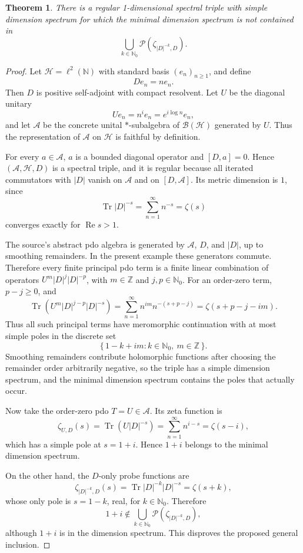 \documentclass[11pt]{article}
\newtheorem{theorem}{Theorem}
\newcommand{\N}{\mathbb{N}}
\newcommand{\Hil}{\mathcal{H}}
\newcommand{\Alg}{\mathcal{A}}
\newcommand{\Tr}{\operatorname{Tr}}
\begin{document}
\begin{theorem}
There is a regular 1-dimensional spectral triple with simple dimension
spectrum for which the minimal dimension spectrum is not contained in
\[
  \bigcup_{k\in\N_0}\mathcal P(\zeta_{|D|^{-k},D}).
\]
\end{theorem}

\begin{proof}
Let \(\Hil=\ell^2(\N)\) with standard basis \((e_n)_{n\geq 1}\), and define
\[
  D e_n = n e_n .
\]
Then \(D\) is positive self-adjoint with compact resolvent.  Let \(U\) be the
diagonal unitary
\[
  U e_n = n^i e_n = e^{i\log n}e_n ,
\]
and let \(\Alg\) be the concrete unital \(*\)-subalgebra of
\(\mathcal B(\Hil)\) generated by \(U\).  Thus the representation of
\(\Alg\) on \(\Hil\) is faithful by definition.

For every \(a\in\Alg\), \(a\) is a bounded diagonal operator and
\([D,a]=0\).  Hence \((\Alg,\Hil,D)\) is a spectral triple, and it is regular
because all iterated commutators with \(|D|\) vanish on \(\Alg\) and on
\([D,\Alg]\).  Its metric dimension is \(1\), since
\[
  \Tr |D|^{-s}=\sum_{n=1}^\infty n^{-s}=\zeta(s)
\]
converges exactly for \(\operatorname{Re}s>1\).

The source's abstract pdo algebra is generated by \(\Alg\), \(D\), and
\(|D|\), up to smoothing remainders.  In the present example these generators
commute.  Therefore every finite principal pdo term is a finite linear
combination of operators \(U^m |D|^j |D|^{-p}\), with \(m\in\mathbb Z\) and
\(j,p\in\N_0\).  For an order-zero term, \(p-j\geq0\), and
\[
  \Tr\!\left(U^m |D|^{j-p}|D|^{-s}\right)
  =
  \sum_{n=1}^\infty n^{im} n^{-(s+p-j)}
  =
  \zeta(s+p-j-im).
\]
Thus all such principal terms have meromorphic continuation with at most
simple poles in the discrete set
\[
  \{\,1-k+im : k\in\N_0,\ m\in\mathbb Z\,\}.
\]
Smoothing remainders contribute holomorphic functions after choosing the
remainder order arbitrarily negative, so the triple has a simple dimension
spectrum, and the minimal dimension spectrum contains the poles that actually
occur.

Now take the order-zero pdo \(T=U\in\Alg\).  Its zeta function is
\[
  \zeta_{U,D}(s)
  =
  \Tr(U|D|^{-s})
  =
  \sum_{n=1}^\infty n^{i-s}
  =
  \zeta(s-i),
\]
which has a simple pole at \(s=1+i\).  Hence \(1+i\) belongs to the minimal
dimension spectrum.

On the other hand, the \(D\)-only probe functions are
\[
  \zeta_{|D|^{-k},D}(s)
  =
  \Tr |D|^{-k}|D|^{-s}
  =
  \zeta(s+k),
\]
whose only pole is \(s=1-k\), real, for \(k\in\N_0\).  Therefore
\[
  1+i \notin \bigcup_{k\in\N_0}\mathcal P(\zeta_{|D|^{-k},D}),
\]
although \(1+i\) is in the dimension spectrum.  This disproves the proposed
general inclusion.
\end{proof}
\end{document}
